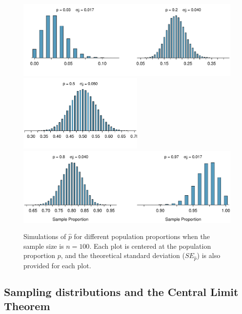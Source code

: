 \begin{figure}
   \centering
   \includegraphics[width=\textwidth]{ch_inference_for_props/figures/sampling_100_prop_X/sampling_100_prop_X_12}
   \includegraphics[width=0.55\textwidth]{ch_inference_for_props/figures/sampling_100_prop_X/sampling_100_prop_X_3}
   \includegraphics[width=\textwidth]{ch_inference_for_props/figures/sampling_100_prop_X/sampling_100_prop_X_45}
   \caption{Simulations of $\hat{p}$ for different population
       proportions when the sample size is $n = 100$. Each plot
       is centered at the population proportion $p$, and the
       theoretical standard deviation ($SE_{\hat{p}}$) is
       also provided for each plot.}
   \label{sampling_X_prop_56p}
\end{figure}



\subsection{Sampling distributions and the Central Limit Theorem}

